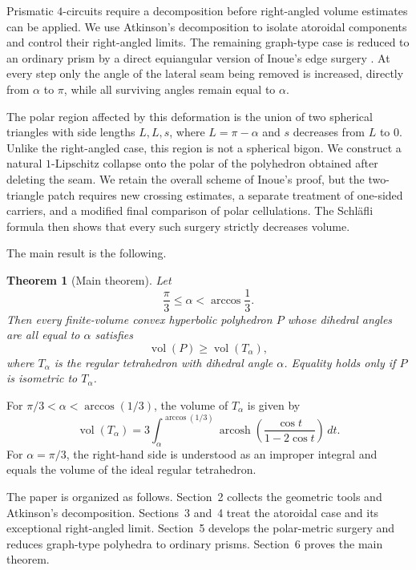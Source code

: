 \documentclass[12pt,a4paper]{article}
\newtheorem{theorem}{Theorem}[section]
\theoremstyle{definition}
\DeclareMathOperator{\Vol}{vol}
\DeclareMathOperator{\arcosh}{arcosh}
\begin{document}
Prismatic \(4\)-circuits require a decomposition before right-angled volume estimates can be applied. We use Atkinson's decomposition to isolate atoroidal components and control their right-angled limits. The remaining graph-type case is reduced to an ordinary prism by a direct equiangular version of Inoue's edge surgery \cite[Section~8]{Inoue2008}. At every step only the angle of the lateral seam being removed is increased, directly from \(\alpha\) to \(\pi\), while all surviving angles remain equal to \(\alpha\).

The polar region affected by this deformation is the union of two spherical
triangles with side lengths \(L,L,s\), where \(L=\pi-\alpha\) and \(s\)
decreases from \(L\) to \(0\). Unlike the right-angled case, this region is
not a spherical bigon. We construct a natural \(1\)-Lipschitz collapse onto
the polar of the polyhedron obtained after deleting the seam. We retain the
overall scheme of Inoue's proof, but the two-triangle patch requires new
crossing estimates, a separate treatment of one-sided carriers, and a
modified final comparison of polar cellulations. The Schl\"afli formula then
shows that every such surgery strictly decreases volume.

The main result is the following.

\begin{theorem}[Main theorem]\label{thm:main}
Let
\[
        \frac{\pi}{3}\le\alpha<\arccos\frac13 .
\]
Then every finite-volume convex hyperbolic polyhedron \(P\) whose dihedral angles are all equal to \(\alpha\) satisfies
\[
        \Vol(P)\ge \Vol(T_\alpha),
\]
where \(T_\alpha\) is the regular tetrahedron with dihedral angle \(\alpha\). Equality holds only if \(P\) is isometric to \(T_\alpha\).
\end{theorem}

For \(\pi/3<\alpha<\arccos(1/3)\), the volume of \(T_\alpha\) is given by
\begin{equation}\label{eq:tetra-volume-intro}
        \Vol(T_\alpha)=
        3\int_\alpha^{\arccos(1/3)}
        \arcosh\left(
        \frac{\cos t}{1-2\cos t}
        \right)\,dt .
\end{equation}
For \(\alpha=\pi/3\), the right-hand side is understood as an improper integral and equals the volume of the ideal regular tetrahedron.

The paper is organized as follows. Section~2 collects the geometric tools and
Atkinson's decomposition. Sections~3 and~4 treat the atoroidal case and its
exceptional right-angled limit. Section~5 develops the polar-metric surgery
and reduces graph-type polyhedra to ordinary prisms. Section~6 proves the main
theorem.
\end{document}

